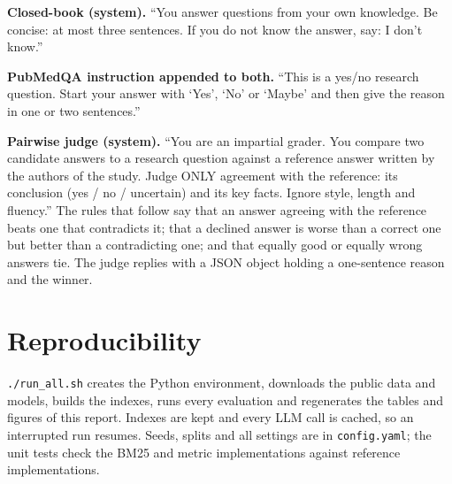 \documentclass[11pt]{article}
\begin{document}
\textbf{Closed-book (system).} ``You answer questions from your own knowledge. Be concise: at
most three sentences. If you do not know the answer, say: I don't know.''

\textbf{PubMedQA instruction appended to both.} ``This is a yes/no research question. Start
your answer with `Yes', `No' or `Maybe' and then give the reason in one or two sentences.''

\textbf{Pairwise judge (system).} ``You are an impartial grader. You compare two candidate
answers to a research question against a reference answer written by the authors of the
study. Judge ONLY agreement with the reference: its conclusion (yes / no / uncertain) and its
key facts. Ignore style, length and fluency.'' The rules that follow say that an answer
agreeing with the reference beats one that contradicts it; that a declined answer is worse
than a correct one but better than a contradicting one; and that equally good or equally
wrong answers tie. The judge replies with a JSON object holding a one-sentence reason and the
winner.

\section{Reproducibility}

\texttt{./run\_all.sh} creates the Python environment, downloads the public data and models,
builds the indexes, runs every evaluation and regenerates the tables and figures of this
report. Indexes are kept and every LLM call is cached, so an interrupted run resumes.
Seeds, splits and all settings are in \texttt{config.yaml}; the unit tests check the BM25 and
metric implementations against reference implementations.
\end{document}
